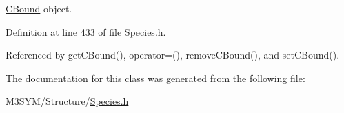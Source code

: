 \hyperlink{classCBound}{C\+Bound} object. 



Definition at line 433 of file Species.\+h.



Referenced by get\+C\+Bound(), operator=(), remove\+C\+Bound(), and set\+C\+Bound().



The documentation for this class was generated from the following file\+:\begin{DoxyCompactItemize}
\item 
M3\+S\+Y\+M/\+Structure/\hyperlink{Species_8h}{Species.\+h}\end{DoxyCompactItemize}
